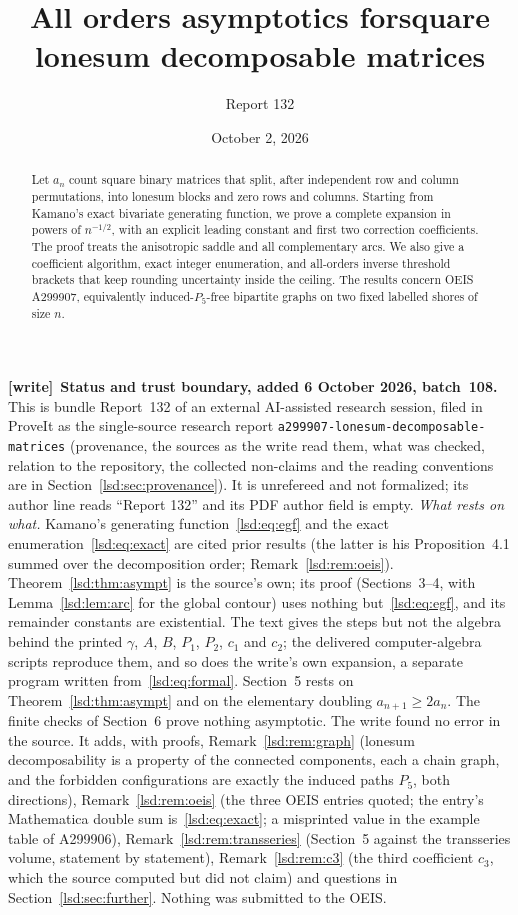 \documentclass[11pt]{article}
\title{All orders asymptotics for\newline square lonesum decomposable matrices}
\author{Report 132}
\date{October 2, 2026}
\theoremstyle{remark}\newtheorem{remark}{Remark}
\newcommand{\file}[1]{\nolinkurl{#1}}
\newenvironment{writenote}[1][]{\par\smallskip\begingroup\small
 \noindent\textbf{[write]}\if\relax\detokenize{#1}\relax\else~\textbf{#1.}\fi\ }%
 {\par\endgroup\smallskip}
\begin{document}
\maketitle

\begin{abstract}
Let $a_n$ count square binary matrices that split, after independent row and column permutations, into lonesum blocks and zero rows and columns. Starting from Kamano's exact bivariate generating function, we prove a complete expansion in powers of $n^{-1/2}$, with an explicit leading constant and first two correction coefficients. The proof treats the anisotropic saddle and all complementary arcs. We also give a coefficient algorithm, exact integer enumeration, and all-orders inverse threshold brackets that keep rounding uncertainty inside the ceiling. The results concern OEIS A299907, equivalently induced-$P_5$-free bipartite graphs on two fixed labelled shores of size $n$.
\end{abstract}

\begin{writenote}[Status and trust boundary, added 6 October 2026, batch~108]
This is bundle Report~132 of an external AI-assisted research session, filed
in ProveIt as the single-source research report
\file{a299907-lonesum-decomposable-matrices} (provenance, the sources as the
write read them, what was checked, relation to the repository, the collected
non-claims and the reading conventions are in
Section~\ref{lsd:sec:provenance}). It is unrefereed and not formalized; its
author line reads ``Report 132'' and its PDF author field is empty.
\emph{What rests on what.} Kamano's generating
function~\eqref{lsd:eq:egf} and the exact enumeration~\eqref{lsd:eq:exact}
are cited prior results (the latter is his Proposition~4.1 summed over the
decomposition order; Remark~\ref{lsd:rem:oeis}). Theorem~\ref{lsd:thm:asympt}
is the source's own; its proof (Sections~3--4, with Lemma~\ref{lsd:lem:arc}
for the global contour) uses nothing but~\eqref{lsd:eq:egf}, and its
remainder constants are existential. The text gives the steps but not the
algebra behind the printed $\gamma$, $A$, $B$, $P_1$, $P_2$, $c_1$ and $c_2$;
the delivered computer-algebra scripts reproduce them, and so does the write's
own expansion, a separate program written from~\eqref{lsd:eq:formal}.
Section~5 rests on Theorem~\ref{lsd:thm:asympt} and on the elementary
doubling $a_{n+1}\ge2a_n$. The finite checks of Section~6 prove nothing
asymptotic. The write found no error in the source. It adds, with proofs,
Remark~\ref{lsd:rem:graph} (lonesum decomposability is a property of the
connected components, each a chain graph, and the forbidden configurations are
exactly the induced paths $P_5$, both directions),
Remark~\ref{lsd:rem:oeis} (the three OEIS entries quoted; the entry's
Mathematica double sum is~\eqref{lsd:eq:exact}; a misprinted value in the
example table of A299906), Remark~\ref{lsd:rem:transseries} (Section~5 against
the transseries volume, statement by statement), Remark~\ref{lsd:rem:c3} (the
third coefficient $c_3$, which the source computed but did not claim) and
questions in Section~\ref{lsd:sec:further}. Nothing was submitted to the OEIS.
\end{writenote}
\end{document}

